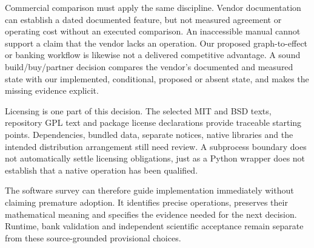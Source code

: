 Commercial comparison must apply the same discipline. Vendor documentation can
establish a dated documented feature, but not measured agreement or operating
cost without an executed comparison. An inaccessible manual cannot support a
claim that the vendor lacks an operation. Our proposed graph-to-effect or
banking workflow is likewise not a delivered competitive advantage. A sound
build/buy/partner decision compares the vendor's documented and measured state
with our implemented, conditional, proposed or absent state, and makes the
missing evidence explicit.

Licensing is one part of this decision. The selected MIT and BSD texts,
repository GPL text and package license declarations provide traceable starting
points. Dependencies, bundled data, separate notices, native libraries and the
intended distribution arrangement still need review. A subprocess boundary
does not automatically settle licensing obligations, just as a Python wrapper
does not establish that a native operation has been qualified.

The software survey can therefore guide implementation immediately without
claiming premature adoption. It identifies precise operations, preserves their
mathematical meaning and specifies the evidence needed for the next decision.
Runtime, bank validation and independent scientific acceptance remain separate
from these source-grounded provisional choices.
